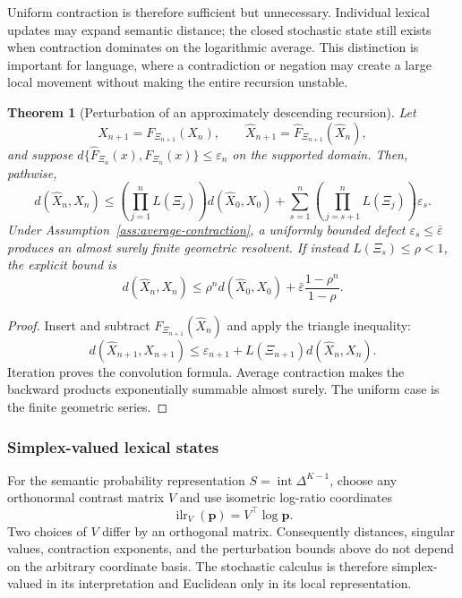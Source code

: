 \documentclass[11pt]{article}
\newtheorem{theorem}[definition]{Theorem}
\begin{document}
Uniform contraction is therefore sufficient but unnecessary.  Individual
lexical updates may expand semantic distance; the closed stochastic state
still exists when contraction dominates on the logarithmic average.  This
distinction is important for language, where a contradiction or negation may
create a large local movement without making the entire recursion unstable.

\begin{theorem}[Perturbation of an approximately descending recursion]
\label{thm:stochastic-perturbation}
Let
\[
X_{n+1}=F_{\Xi_{n+1}}(X_n),\qquad
\widehat X_{n+1}=\widehat F_{\Xi_{n+1}}(\widehat X_n),
\]
and suppose
$d\{\widehat F_{\Xi_n}(x),F_{\Xi_n}(x)\}\le\varepsilon_n$ on the supported
domain.  Then, pathwise,
\[
d(\widehat X_n,X_n)
\le
\left(\prod_{j=1}^nL(\Xi_j)\right)d(\widehat X_0,X_0)
+\sum_{s=1}^n
\left(\prod_{j=s+1}^nL(\Xi_j)\right)\varepsilon_s.
\]
Under Assumption~\ref{ass:average-contraction}, a uniformly bounded defect
$\varepsilon_s\le\bar\varepsilon$ produces an almost surely finite geometric
resolvent.  If instead $L(\Xi_s)\le\rho<1$, the explicit bound is
\[
d(\widehat X_n,X_n)
\le\rho^nd(\widehat X_0,X_0)
+\bar\varepsilon\frac{1-\rho^n}{1-\rho}.
\]
\end{theorem}

\begin{proof}
Insert and subtract
$F_{\Xi_{n+1}}(\widehat X_n)$ and apply the triangle inequality:
\[
d(\widehat X_{n+1},X_{n+1})
\le\varepsilon_{n+1}+L(\Xi_{n+1})d(\widehat X_n,X_n).
\]
Iteration proves the convolution formula.  Average contraction makes the
backward products exponentially summable almost surely.  The uniform case is
the finite geometric series.
\end{proof}

\subsubsection{Simplex-valued lexical states}

For the semantic probability representation
$S=\operatorname{int}\Delta^{K-1}$, choose any orthonormal contrast matrix
$V$ and use isometric log-ratio coordinates
\[
\operatorname{ilr}_V(\bm p)=V^\top\log\bm p.
\]
Two choices of $V$ differ by an orthogonal matrix.  Consequently distances,
singular values, contraction exponents, and the perturbation bounds above do
not depend on the arbitrary coordinate basis.  The stochastic calculus is
therefore simplex-valued in its interpretation and Euclidean only in its
local representation.
\end{document}
